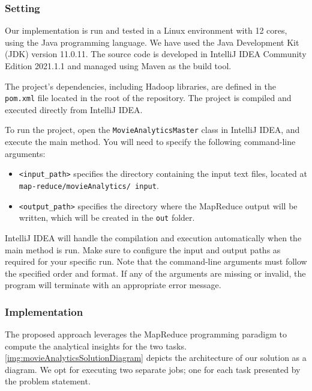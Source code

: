 \documentclass[acmlarge]{acmart}
\begin{document}
\subsubsection{Setting}
Our implementation is run and tested in a Linux environment with 12 cores, using the Java programming language.
We have used the Java Development Kit (JDK) version 11.0.11.
The source code is developed in IntelliJ IDEA Community Edition 2021.1.1 and managed using Maven as the build tool.

The project’s dependencies, including Hadoop libraries, are defined in the \texttt{pom.xml} file located in the root of
the repository.
The project is compiled and executed directly from IntelliJ IDEA.

To run the project, open the \texttt{MovieAnalyticsMaster} class in IntelliJ IDEA, and execute the main method.
You will need to specify the following command-line arguments:

\begin{itemize}
  \item \texttt{<input\_path>} specifies the directory containing the input text files, located at \texttt{map-reduce/movieAnalytics/ input}.
  \item \texttt{<output\_path>} specifies the directory where the MapReduce output will be written, which will be created in the \texttt{out} folder.
\end{itemize}

IntelliJ IDEA will handle the compilation and execution automatically when the main method is run. Make sure to configure the input and output paths as required for your specific run. Note that the command-line arguments must follow the specified order and format. If any of the arguments are missing or invalid, the program will terminate with an appropriate error message.

\subsubsection{Implementation}
The proposed approach leverages the MapReduce programming paradigm to compute the analytical insights for the two tasks. \autoref{img:movieAnalyticsSolutionDiagram} depicts the architecture of our solution as a diagram. We opt for executing two separate jobs; one for each task presented by the problem statement.
\end{document}
